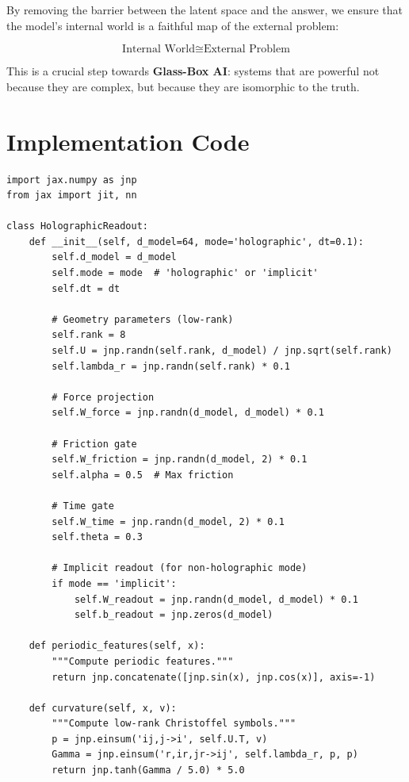 \documentclass[12pt,letterpaper,twoside]{article}
\begin{document}
By removing the barrier between the latent space and the answer, we ensure that the model's internal world is a faithful map of the external problem:

\[
\boxed{\text{Internal World} \cong \text{External Problem}}
\]

This is a crucial step towards \textbf{Glass-Box AI}: systems that are powerful not because they are complex, but because they are isomorphic to the truth.

\clearpage

\appendix

\section{Implementation Code}

\begin{verbatim}
import jax.numpy as jnp
from jax import jit, nn

class HolographicReadout:
    def __init__(self, d_model=64, mode='holographic', dt=0.1):
        self.d_model = d_model
        self.mode = mode  # 'holographic' or 'implicit'
        self.dt = dt
        
        # Geometry parameters (low-rank)
        self.rank = 8
        self.U = jnp.randn(self.rank, d_model) / jnp.sqrt(self.rank)
        self.lambda_r = jnp.randn(self.rank) * 0.1
        
        # Force projection
        self.W_force = jnp.randn(d_model, d_model) * 0.1
        
        # Friction gate
        self.W_friction = jnp.randn(d_model, 2) * 0.1
        self.alpha = 0.5  # Max friction
        
        # Time gate
        self.W_time = jnp.randn(d_model, 2) * 0.1
        self.theta = 0.3
        
        # Implicit readout (for non-holographic mode)
        if mode == 'implicit':
            self.W_readout = jnp.randn(d_model, d_model) * 0.1
            self.b_readout = jnp.zeros(d_model)
    
    def periodic_features(self, x):
        """Compute periodic features."""
        return jnp.concatenate([jnp.sin(x), jnp.cos(x)], axis=-1)
    
    def curvature(self, x, v):
        """Compute low-rank Christoffel symbols."""
        p = jnp.einsum('ij,j->i', self.U.T, v)
        Gamma = jnp.einsum('r,ir,jr->ij', self.lambda_r, p, p)
        return jnp.tanh(Gamma / 5.0) * 5.0
    

\end{verbatim}
\end{document}
